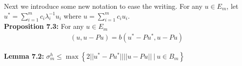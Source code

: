 \documentclass[../../main.tex]{subfiles}
\begin{document}
Next we introduce some new notation to ease the writing. For any $u \in E_{m}$, let $u^{*} = \sum_{i=1}^{m} c_{i}\lambda_{i}^{-1}u_{i}$ where $u = \sum_{i=1}^{m} c_{i}u_{i}$.\\


\textbf{Proposition 7.3:} For any $u \in E_{m}$
\begin{eqnarray*}
( u, u - Pu ) = b(u^{*} - Pu^{*}, u -Pu)
\end{eqnarray*}

\begin{comment}
\textbf{Proof:} For any $i = 1,2,...,m$, we have that
\begin{eqnarray*}
\lambda_{i}( u_{i},u-Pu ) &=&  b(u_{i}, u-Pu)\\
									&=& b(u_{i}, u-Pu) - b(u-Pu,Pu_{i}) \ \textrm{ (by definition of Rayleigh-Ritz Projection)}\\
									&=&  b(u_{i}, u-Pu) - b(Pu_{i},u-Pu)\\
									&=&  b(u_{i}-Pu_{i}, u-Pu)
\end{eqnarray*}
So multiplying by $c_{i}\lambda_{i}^{-1}$ and summation over i gives:
\begin{eqnarray*}
\sum_{i=1}^{m} c_{i}\lambda_{i}^{-1}\lambda_{i}( u_{i},u-Pu ) &=& \sum_{i=1}^{m} c_{i}\lambda_{i}^{-1}b(u_{i}-Pu_{i}, u-Pu)\\
									&=& b(\sum_{i=1}^{m} c_{i}\lambda_{i}^{-1}u_{i}-\sum_{i=1}^{m} c_{i}\lambda_{i}^{-1}Pu_{i}, u-Pu)\\
									&=& b(u^{*}-Pu^{*}, u-Pu)
\end{eqnarray*}
So $( u,u-Pu ) = b(u^{*}-Pu^{*}, u-Pu)$.\qed\\
\end{comment}

\textbf{Lemma 7.2:} $\sigma_{m}^{h} \leq \max \left\{2||u^{*}- Pu^{*}|| ||u-Pu|| \ | \ u \in B_{m} \right\}$\\

\begin{comment}
\textbf{Proof:} From Proposition 7.1, we have
\begin{eqnarray*}
\sigma_{m}^{h} &=& \max\left\{ 2( u,u-Pu )-||u-Pu||^{2} \ | \ u \in B_{m} \right \} \\
				&\leq & \max\left\{ 2( u,u-Pu ) \ | \ u \in B_{m} \right \}
\end{eqnarray*} since $||u-Pu||^{2} \geq 0$.\\
\end{comment}
\end{document}
